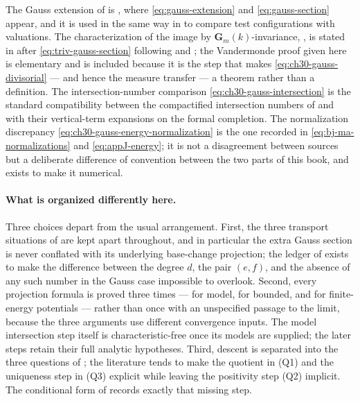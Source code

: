 The Gauss extension of  is
\cite[\S1.3 and Remark~1.9]{BJ22}, where \eqref{eq:gauss-extension} and
\eqref{eq:gauss-section} appear, and it is used in the same way in
\cite{BHJ17} to compare test configurations with valuations.  The
characterization of the image by $\mathbf G_m(k)$-invariance,
, is stated in
 after
\eqref{eq:triv-gauss-section} following \cite[\S1]{BJ22} and
\cite[\S4.1, Lemma~4.2]{BHJ17}; the Vandermonde proof given here is elementary and is
included because it is the step that makes
\eqref{eq:ch30-gauss-divisorial} --- and hence the measure transfer --- a
theorem rather than a definition.  The intersection-number comparison
\eqref{eq:ch30-gauss-intersection} is the standard compatibility between
the compactified intersection numbers of
\cite[\S6.6, Definition~6.11 and Remark~6.12]{BHJ17}
and \cite[\S7]{BJ22} with their vertical-term expansions on the
formal completion.  The normalization discrepancy
\eqref{eq:ch30-gauss-energy-normalization} is the one recorded in
\eqref{eq:bj-ma-normalizations} and \eqref{eq:appJ-energy}; it is not a
disagreement between sources but a deliberate difference of convention
between the two parts of this book, and
 exists to make it numerical.

\paragraph{What is organized differently here.}
Three choices depart from the usual arrangement.  First, the three
transport situations of  are kept apart
throughout, and in particular the extra Gauss section is never conflated
with its underlying base-change projection; the ledger of
 exists to make the difference between the
degree $d$, the pair $(e,f)$, and the absence of any such number in the
Gauss case impossible to overlook.  Second, every projection formula is
proved three times --- for model, for bounded, and for finite-energy
potentials --- rather than once with an unspecified passage to the limit,
because the three arguments use different convergence inputs.
The model intersection step itself is characteristic-free once its
models are supplied; the later steps retain their full analytic
hypotheses.  Third, descent is separated into the
three questions of ; the literature tends
to make the quotient in (Q1) and the uniqueness step in (Q3) explicit while
leaving the positivity step (Q2) implicit.  The conditional form of
 records exactly that missing step.

